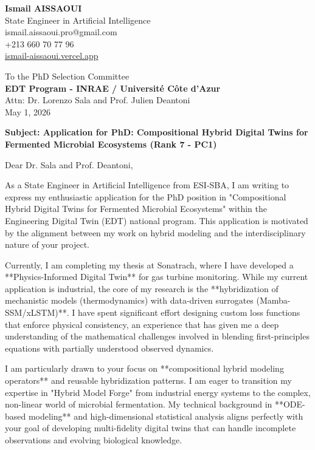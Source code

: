 \documentclass[a4paper,12pt]{article}
\begin{document}
\begin{flushleft}
    \textbf{Ismail AISSAOUI} \\
    State Engineer in Artificial Intelligence \\
    ismail.aissaoui.pro@gmail.com \\
    +213 660 70 77 96 \\
    \href{https://ismail-aissaoui.vercel.app}{ismail-aissaoui.vercel.app}
\end{flushleft}

\begin{flushright}
    To the PhD Selection Committee \\
    \textbf{EDT Program - INRAE / Université Côte d’Azur} \\
    Attn: Dr. Lorenzo Sala and Prof. Julien Deantoni \\
    \medskip
    May 1, 2026
\end{flushright}

\bigskip

\noindent \textbf{Subject: Application for PhD: Compositional Hybrid Digital Twins for Fermented Microbial Ecosystems (Rank 7 - PC1)}

\bigskip

Dear Dr. Sala and Prof. Deantoni,

As a State Engineer in Artificial Intelligence from ESI-SBA, I am writing to express my enthusiastic application for the PhD position in "Compositional Hybrid Digital Twins for Fermented Microbial Ecosystems" within the Engineering Digital Twin (EDT) national program. This application is motivated by the alignment between my work on hybrid modeling and the interdisciplinary nature of your project.

Currently, I am completing my thesis at Sonatrach, where I have developed a **Physics-Informed Digital Twin** for gas turbine monitoring. While my current application is industrial, the core of my research is the **hybridization of mechanistic models (thermodynamics) with data-driven surrogates (Mamba-SSM/xLSTM)**. I have spent significant effort designing custom loss functions that enforce physical consistency, an experience that has given me a deep understanding of the mathematical challenges involved in blending first-principles equations with partially understood observed dynamics.

I am particularly drawn to your focus on **compositional hybrid modeling operators** and reusable hybridization patterns. I am eager to transition my expertise in "Hybrid Model Forge" from industrial energy systems to the complex, non-linear world of microbial fermentation. My technical background in **ODE-based modeling** and high-dimensional statistical analysis aligns perfectly with your goal of developing multi-fidelity digital twins that can handle incomplete observations and evolving biological knowledge.
\end{document}
